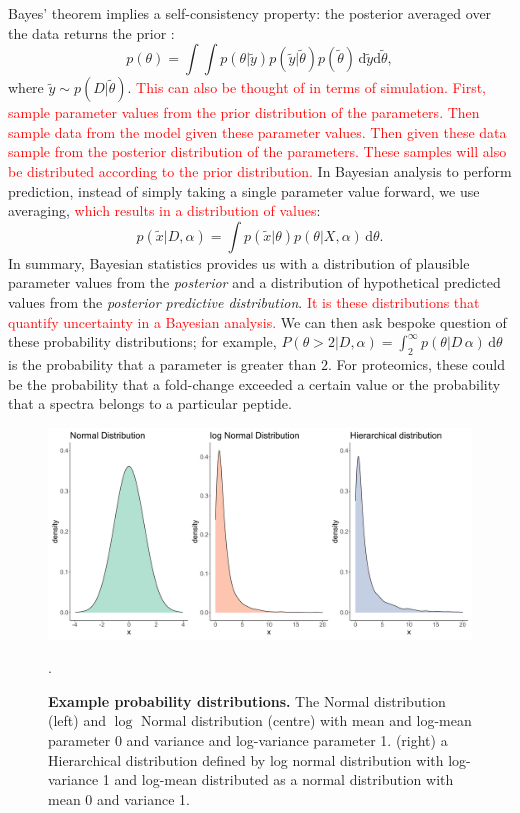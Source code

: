 \documentclass[12pt,english, journal=jpr, layout=twocolumn]{article}
\begin{document}
Bayes' theorem implies a self-consistency property: the posterior averaged over the data returns the prior \citep{Talts::2018}:
\begin{equation}
p(\theta) = \int \int p(\theta|\tilde{y})p(\tilde{y}|\tilde{\theta})p(\tilde{\theta})\,\text{d}\tilde{y}\text{d}\tilde{\theta},
\end{equation}
where $\tilde{y} \sim p(D|\tilde{\theta})$. \textcolor{red}{This can also be thought of in terms of simulation. First, sample parameter values from the prior distribution of the parameters. Then sample data from the model given these parameter values. Then given these data sample from the posterior distribution of the parameters. These samples will also be distributed according to the prior distribution.} In Bayesian analysis to perform prediction, instead of simply taking a single parameter value forward, we use averaging, \textcolor{red}{which results in a distribution of values}:
\begin{equation}
p(\tilde{x}|D,\alpha) = \int p(\tilde{x}|\theta)p(\theta|X,\alpha)\,\text{d}\theta.
\end{equation}
In summary, Bayesian statistics provides us with a distribution of plausible parameter values from the \textit{posterior} and a distribution of hypothetical predicted values from the \textit{posterior predictive distribution}. \textcolor{red}{It is these distributions that quantify uncertainty in a Bayesian analysis.} We can then ask bespoke question of these probability distributions; for example, $P(\theta > 2|D, \alpha) = \int_{2}^{\infty}p(\theta|D\,\alpha)\,\text{d}\theta$ is the probability that a parameter is greater than $2$. For proteomics, these could be the probability that a fold-change exceeded a certain value or the probability that a spectra belongs to a particular peptide. 
\begin{figure}[H]
	\centering
	\includegraphics[width =1\textwidth]{figure1distribution.pdf}
	\caption{\textbf{Example probability distributions.} The Normal distribution (left) and $\log$ Normal distribution (centre) with mean and log-mean parameter 0 and variance and log-variance parameter 1. (right) a Hierarchical distribution defined by log normal distribution with log-variance 1 and log-mean distributed as a normal distribution with mean 0 and variance 1.}.
	\label{figure::figure1dist}
\end{figure}
\end{document}
